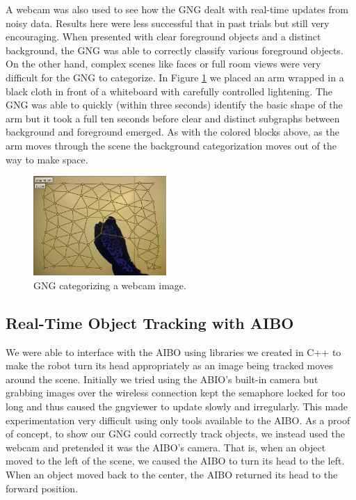 \documentclass{article}
\renewcommand{\|}{\origbar} %
\begin{document}
A webcam was also used to see how the GNG dealt with real-time updates from noisy data. Results here were less successful that in past trials but still very encouraging. When presented with clear foreground objects and a distinct background, the GNG was able to correctly classify various foreground objects. On the other hand, complex scenes like faces or full room views were very difficult for the GNG to categorize. In Figure \ref{fig:webcam} we placed an arm wrapped in a black cloth in front of a whiteboard with carefully controlled lightening. The GNG was able to quickly (within three seconds) identify the basic shape of the arm but it took a full ten seconds before clear and distinct subgraphs between background and foreground emerged. As with the colored blocks above, as the arm moves through the scene the background categorization moves out of the way to make space.

\begin{figure}[h!]
  \centering
  
  \includegraphics[width=0.45\textwidth]{webcam.png}
  
  \caption{GNG categorizing a webcam image.}
  \label{fig:webcam}
\end{figure}

\subsection{Real-Time Object Tracking with AIBO}

We were able to interface with the AIBO using libraries we created in C++ to make the robot turn its head appropriately as an image being tracked moves around the scene. Initially we tried using the ABIO's built-in camera but grabbing images over the wireless connection kept the semaphore locked for too long and thus caused the gngviewer to update slowly and irregularly. This made experimentation very difficult using only tools available to the AIBO. As a proof of concept, to show our GNG could correctly track objects, we instead used the webcam and pretended it was the AIBO's camera. That is, when an object moved to the left of the scene, we caused the AIBO to turn its head to the left. When an object moved back to the center, the AIBO returned its head to the forward position.
\end{document}
